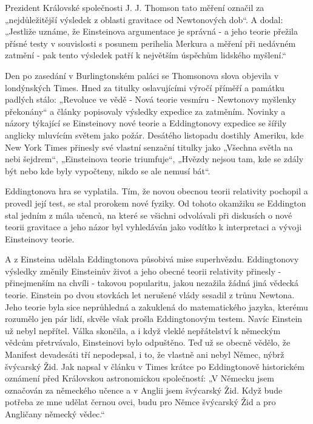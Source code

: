   Prezident Královské společnosti J. J. Thomson tato měření označil za „nejdůležitější výsledek z
  oblasti gravitace od Newtonových dob“. A dodal: „Jestliže uznáme, že Einsteinova argumentace je
  správná - a jeho teorie přežila přísné testy v souvislosti s posunem perihelia Merkura a měření
  při nedávném zatmění - pak tento výsledek patří k největším úspěchům lidského myšlení.“
  
  Den po zasedání v Burlingtonském paláci se Thomsonova slova objevila v londýnských Times. Hned za
  titulky oslavujícími výročí příměří a památku padlých stálo: „Revoluce ve vědě - Nová teorie
  vesmíru - Newtonovy myšlenky překonány“ a články popisovaly výsledky expedice za zatměním. Novinky
  a názory týkající se Einsteinovy nové teorie a Eddingtonovy expedice se šířily anglicky mluvícím
  světem jako požár. Desátého listopadu dostihly Ameriku, kde New York Times přinesly své vlastní
  senzační titulky jako „Všechna světla na nebi šejdrem“, „Einsteinova teorie triumfuje“, „Hvězdy
  nejsou tam, kde se zdály být nebo kde byly vypočteny, nikdo se ale nemusí bát“. 
  
  Eddingtonova hra se vyplatila. Tím, že novou obecnou teorii relativity pochopil a provedl její
  test, se stal prorokem nové fyziky. Od tohoto okamžiku se Eddington stal jedním z mála učenců, na
  které se všichni odvolávali při diskusích o nové teorii gravitace a jeho názor byl vyhledáván jako
  vodítko k interpretaci a vývoji Einsteinovy teorie. 
  
  A z Einsteina udělala Eddingtonova působivá mise superhvězdu. Eddingtonovy výsledky změnily
  Einsteinův život a jeho obecné teorii relativity přinesly - přinejmenším na chvíli - takovou
  popularitu, jakou nezažila žádná jiná vědecká teorie. Einstein po dvou stovkách let nerušené vlády
  sesadil z trůnu Newtona. Jeho teorie byla sice neprůhledná a zakuklená do matematického jazyka,
  kterému rozumělo jen pár lidí, skvěle však prošla Eddingtonovým testem. Navíc Einstein už nebyl
  nepřítel. Válka skončila, a i když vleklé nepřátelství k německým vědcům přetrvávalo, Einsteinovi
  bylo odpuštěno. Teď už se obecně vědělo, že Manifest devadesáti tří nepodepsal, i to, že vlastně
  ani nebyl Němec, nýbrž švýcarský Žid. Jak napsal v článku v Times krátce po Eddingtonově
  historickém oznámení před Královskou astronomickou společností: „V Německu jsem označován za
  německého učence a v Anglii jsem švýcarský Žid. Když bude potřeba ze mne udělat černou ovci, budu
  pro Němce švýcarský Žid a pro Angličany německý vědec.“
  
